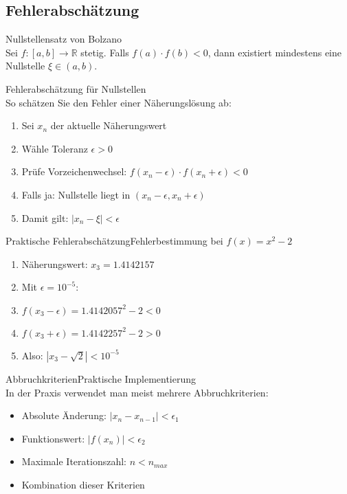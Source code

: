 \subsection{Fehlerabschätzung}

\begin{lemma}{Nullstellensatz von Bolzano}\\
Sei $f:[a,b] \rightarrow \mathbb{R}$ stetig. Falls $f(a) \cdot f(b) < 0$, dann existiert mindestens eine Nullstelle $\xi \in (a,b)$.
\end{lemma}

\begin{KR}{Fehlerabschätzung für Nullstellen}\\
So schätzen Sie den Fehler einer Näherungslösung ab:
\begin{enumerate}
    \item Sei $x_n$ der aktuelle Näherungswert
    \item Wähle Toleranz $\epsilon > 0$
    \item Prüfe Vorzeichenwechsel: $f(x_n-\epsilon) \cdot f(x_n+\epsilon) < 0$
    \item Falls ja: Nullstelle liegt in $(x_n-\epsilon, x_n+\epsilon)$
    \item Damit gilt: $|x_n-\xi| < \epsilon$
\end{enumerate}
\end{KR}

\begin{example2}{Praktische Fehlerabschätzung}{Fehlerbestimmung bei $f(x)=x^2-2$}
\begin{enumerate}
    \item Näherungswert: $x_3 = 1.4142157$
    \item Mit $\epsilon = 10^{-5}$:
    \item $f(x_3-\epsilon) = 1.4142057^2 - 2 < 0$
    \item $f(x_3+\epsilon) = 1.4142257^2 - 2 > 0$
    \item Also: $|x_3-\sqrt{2}| < 10^{-5}$
\end{enumerate}
\end{example2}

\begin{remark2}{Abbruchkriterien}{Praktische Implementierung}\\
In der Praxis verwendet man meist mehrere Abbruchkriterien:
\begin{itemize}
    \item Absolute Änderung: $|x_n - x_{n-1}| < \epsilon_1$
    \item Funktionswert: $|f(x_n)| < \epsilon_2$
    \item Maximale Iterationszahl: $n < n_{max}$
    \item Kombination dieser Kriterien
\end{itemize}
\end{remark2}